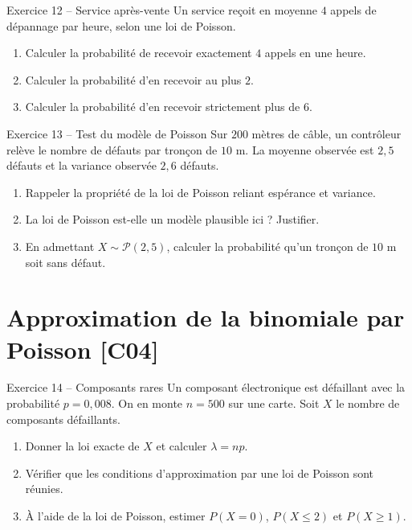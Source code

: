 \documentclass[a4paper,11pt]{article}
\begin{document}
\begin{exo}{Exercice 12 -- Service après-vente}
Un service reçoit en moyenne $4$ appels de dépannage par heure, selon une loi de Poisson.
\begin{enumerate}[label=\alph*)]
  \item Calculer la probabilité de recevoir exactement $4$ appels en une heure.
  \item Calculer la probabilité d'en recevoir au plus $2$.
  \item Calculer la probabilité d'en recevoir strictement plus de $6$.
\end{enumerate}
\end{exo}

\begin{exo}{Exercice 13 -- Test du modèle de Poisson}
Sur $200$ mètres de câble, un contrôleur relève le nombre de défauts par tronçon de $10$ m. La moyenne observée est $2{,}5$ défauts et la variance observée $2{,}6$ défauts.
\begin{enumerate}[label=\alph*)]
  \item Rappeler la propriété de la loi de Poisson reliant espérance et variance.
  \item La loi de Poisson est-elle un modèle plausible ici ? Justifier.
  \item En admettant $X \sim \mathcal{P}(2{,}5)$, calculer la probabilité qu'un tronçon de $10$ m soit sans défaut.
\end{enumerate}
\end{exo}

\section{Approximation de la binomiale par Poisson \hfill {\normalsize\color{uimmred}[C04]}}

\begin{exo}{Exercice 14 -- Composants rares}
Un composant électronique est défaillant avec la probabilité $p = 0{,}008$. On en monte $n = 500$ sur une carte. Soit $X$ le nombre de composants défaillants.
\begin{enumerate}[label=\alph*)]
  \item Donner la loi exacte de $X$ et calculer $\lambda = np$.
  \item Vérifier que les conditions d'approximation par une loi de Poisson sont réunies.
  \item À l'aide de la loi de Poisson, estimer $P(X = 0)$, $P(X \leq 2)$ et $P(X \geq 1)$.
\end{enumerate}
\end{exo}
\end{document}
